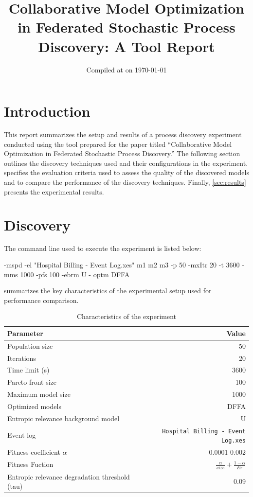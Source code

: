 \documentclass{article}
\begin{document}
\date{Compiled at {\ampmtime} on {\today}}
\title{Collaborative Model Optimization in Federated Stochastic Process Discovery: A Tool Report}
\maketitle
\section{Introduction}
This report summarizes the setup and results of a process discovery experiment conducted using the tool prepared for the paper titled “Collaborative Model Optimization in Federated Stochastic Process Discovery.” 
The following section outlines the discovery techniques used and their configurations in the experiment.
 specifies the evaluation criteria used to assess the quality of the discovered models and to compare the performance of the discovery techniques.
Finally, \cref{sec:results} presents the experimental results.
\section{Discovery}
The command line used to execute the experiment is listed below:
\begin{justify}
 -mspd -el "Hospital Billing - Event Log.xes"  m1  m2  m3 -p 50 -mxItr 20 -t 3600 -mms 1000 -pfs 100 -ebrm U - optm DFFA 
\end{justify}\noindent
{} summarizes the key characteristics of the experimental setup used for performance comparison.
\begin{table}[h!] 
\centering 
\caption{Characteristics of the experiment} 
\label{tbl:experiment} 
\setlength{\tabcolsep}{6pt} %
\fontsize{9}{11}\selectfont 
\begin{tabular}{@{}lr@{}} 
\toprule 
\textbf{Parameter} & \textbf{Value} \\ 
\midrule
Population size &50\\ 
Iterations &20\\ 
Time limit (s) &3600\\ 
Pareto front size &100\\ 
Maximum model size &1000\\ 
Optimized models &DFFA\\ 
Entropic relevance background model &U\\ 
Event log & \texttt{Hospital Billing - Event Log.xes} \\ 
Fitness coefficient $\alpha$ &0.0001 0.002 \\ 
Fitness Fuction &$\frac{\alpha}{size}+\frac{1-\alpha}{Er}$\\ 
Entropic relevance degradation threshold (tau) &0.09\\ 
\bottomrule 
\end{tabular}
\end{table} 
\noindent 
\end{document}
